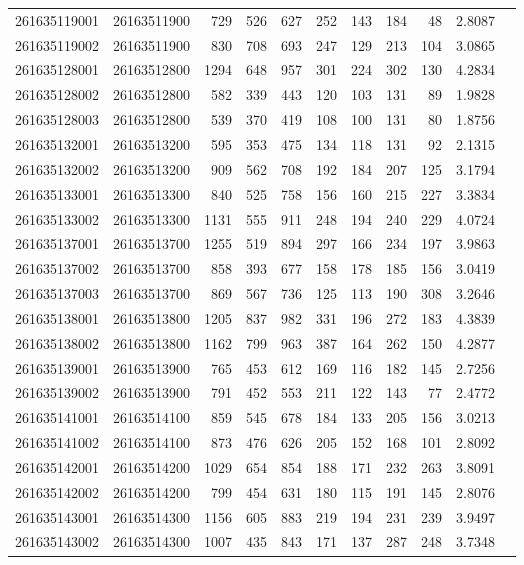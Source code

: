 \documentclass[11pt,landscape]{article}
\begin{document}
{\begin{longtable}[]{@{}lrrrrrrrrrr@{}}
261635119001 & 26163511900 & 729 & 526 & 627 & 252 & 143 & 184 & 48 & 2.8087 \\
261635119002 & 26163511900 & 830 & 708 & 693 & 247 & 129 & 213 & 104 & 3.0865 \\
261635128001 & 26163512800 & 1294 & 648 & 957 & 301 & 224 & 302 & 130 & 4.2834 \\
261635128002 & 26163512800 & 582 & 339 & 443 & 120 & 103 & 131 & 89 & 1.9828 \\
261635128003 & 26163512800 & 539 & 370 & 419 & 108 & 100 & 131 & 80 & 1.8756 \\
261635132001 & 26163513200 & 595 & 353 & 475 & 134 & 118 & 131 & 92 & 2.1315 \\
261635132002 & 26163513200 & 909 & 562 & 708 & 192 & 184 & 207 & 125 & 3.1794 \\
261635133001 & 26163513300 & 840 & 525 & 758 & 156 & 160 & 215 & 227 & 3.3834 \\
261635133002 & 26163513300 & 1131 & 555 & 911 & 248 & 194 & 240 & 229 & 4.0724 \\
261635137001 & 26163513700 & 1255 & 519 & 894 & 297 & 166 & 234 & 197 & 3.9863 \\
261635137002 & 26163513700 & 858 & 393 & 677 & 158 & 178 & 185 & 156 & 3.0419 \\
261635137003 & 26163513700 & 869 & 567 & 736 & 125 & 113 & 190 & 308 & 3.2646 \\
261635138001 & 26163513800 & 1205 & 837 & 982 & 331 & 196 & 272 & 183 & 4.3839 \\
261635138002 & 26163513800 & 1162 & 799 & 963 & 387 & 164 & 262 & 150 & 4.2877 \\
261635139001 & 26163513900 & 765 & 453 & 612 & 169 & 116 & 182 & 145 & 2.7256 \\
261635139002 & 26163513900 & 791 & 452 & 553 & 211 & 122 & 143 & 77 & 2.4772 \\
261635141001 & 26163514100 & 859 & 545 & 678 & 184 & 133 & 205 & 156 & 3.0213 \\
261635141002 & 26163514100 & 873 & 476 & 626 & 205 & 152 & 168 & 101 & 2.8092 \\
261635142001 & 26163514200 & 1029 & 654 & 854 & 188 & 171 & 232 & 263 & 3.8091 \\
261635142002 & 26163514200 & 799 & 454 & 631 & 180 & 115 & 191 & 145 & 2.8076 \\
261635143001 & 26163514300 & 1156 & 605 & 883 & 219 & 194 & 231 & 239 & 3.9497 \\
261635143002 & 26163514300 & 1007 & 435 & 843 & 171 & 137 & 287 & 248 & 3.7348 \\

\end{longtable}}
\end{document}
